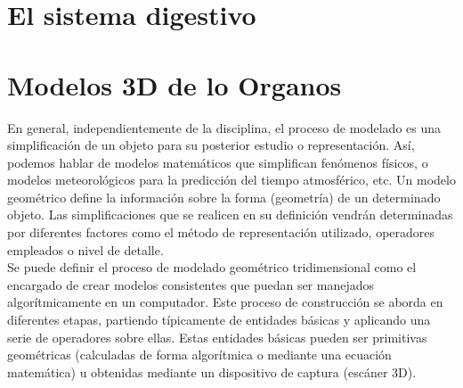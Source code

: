 \section{El sistema digestivo}

\section{Modelos 3D de lo Organos}
En general, independientemente de la disciplina, el proceso de modelado es una simplificación de un objeto para su posterior estudio o representación. Así, podemos hablar de modelos matemáticos que simplifican fenómenos físicos, o modelos meteorológicos para la predicción del tiempo atmosférico, etc. Un modelo geométrico define la información sobre la forma (geometría) de un determinado objeto. Las simplificaciones que se realicen en su definición vendrán determinadas por diferentes factores como el método de representación utilizado, operadores empleados o nivel de detalle.\cite{web13} \\

Se puede definir el proceso de modelado geométrico tridimensional como el encargado de crear modelos consistentes que puedan ser manejados algorítmicamente en un computador. Este proceso de construcción se aborda en diferentes etapas, partiendo típicamente de entidades básicas y aplicando una serie de operadores sobre ellas. Estas entidades básicas pueden ser primitivas geométricas (calculadas de forma algorítmica o mediante una ecuación matemática) u obtenidas mediante un dispositivo de captura (escáner 3D).\\

